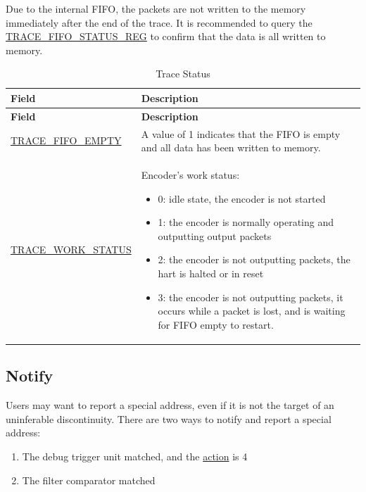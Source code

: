 \documentclass[main\_\_EN.tex]{subfiles}
\begin{document}
Due to the internal FIFO, the packets are not written to the memory immediately after the end of the trace. It is recommended to query the \hyperref[regdesc:TRACEFIFOSTATUSREG]{TRACE\_FIFO\_STATUS\_REG} to confirm that the data is all written to memory.

\begin{longtable}[c]{ |l|L{12.2cm}| }
    \caption{Trace Status}
    \label{riscvtracenc-trace-status}
    \\\hline{}
    \textbf{Field} & \textbf{Description} \\\hline
    \endfirsthead
    \textbf{Field} & \textbf{Description} \\\hline
    \endhead
    \endfoot
    \endlastfoot

    \hyperref[fielddesc:TRACEFIFOEMPTY]{TRACE\_FIFO\_EMPTY} & A value of 1 indicates that the FIFO is empty and all data has been written to memory. \\\hline
    \hyperref[fielddesc:TRACEWORKSTATUS]{TRACE\_WORK\_STATUS} & Encoder's work status:
    \begin{itemize}
        \item 0: idle state, the encoder is not started
        \item 1: the encoder is normally operating and outputting output packets
        \item 2: the encoder is not outputting packets, the hart is halted or in reset
        \item 3: the encoder is not outputting packets, it occurs while a packet is lost, and is waiting for FIFO empty to restart.
    \end{itemize}
    \\\hline

\end{longtable}

\subsection{Notify}

Users may want to report a special address, even if it is not the target of an uninferable discontinuity. There are two ways to notify and report a special address:
\begin{enumerate}
    \item The debug trigger unit matched, and the \hyperref[fielddesc:MCONTROLACTION]{action} is 4
    \item The filter comparator matched
\end{enumerate}
\end{document}
